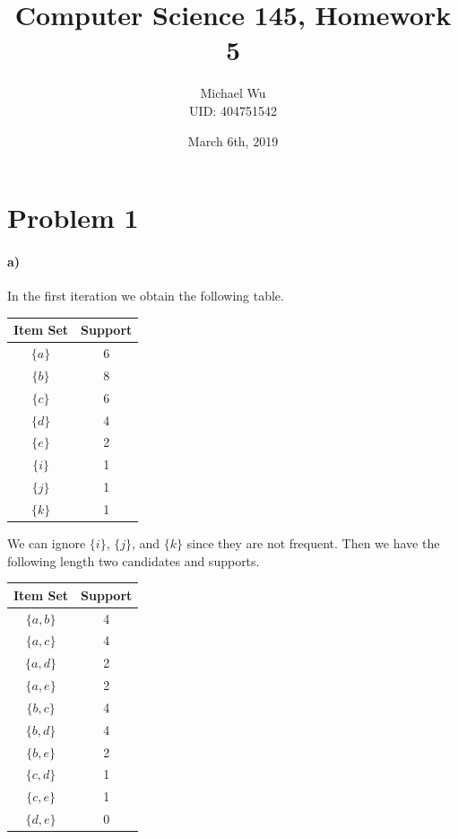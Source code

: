 \documentclass[12pt]{article}
\begin{document}
\title{Computer Science 145, Homework 5}
\date{March 6th, 2019}
\author{Michael Wu\\UID: 404751542}
\maketitle

\section*{Problem 1}

\paragraph{a)}

In the first iteration we obtain the following table.
\begin{center}
    \begin{tabular}{c|c}
        Item Set & Support \\
        \hline
        \(\{a\}\) & 6\\
        \(\{b\}\) & 8\\
        \(\{c\}\) & 6\\
        \(\{d\}\) & 4\\
        \(\{e\}\) & 2\\
        \(\{i\}\) & 1\\
        \(\{j\}\) & 1\\
        \(\{k\}\) & 1
    \end{tabular}
\end{center}
We can ignore \(\{i\}\), \(\{j\}\), and \(\{k\}\) since they are not frequent. Then we have the following length
two candidates and supports.
\begin{center}
    \begin{tabular}{c|c}
        Item Set & Support \\
        \hline
        \(\{a,b\}\) & 4\\
        \(\{a,c\}\) & 4\\
        \(\{a,d\}\) & 2\\
        \(\{a,e\}\) & 2\\
        \(\{b,c\}\) & 4\\
        \(\{b,d\}\) & 4\\
        \(\{b,e\}\) & 2\\
        \(\{c,d\}\) & 1\\
        \(\{c,e\}\) & 1\\
        \(\{d,e\}\) & 0\\
    \end{tabular}
\end{center}
\end{document}
